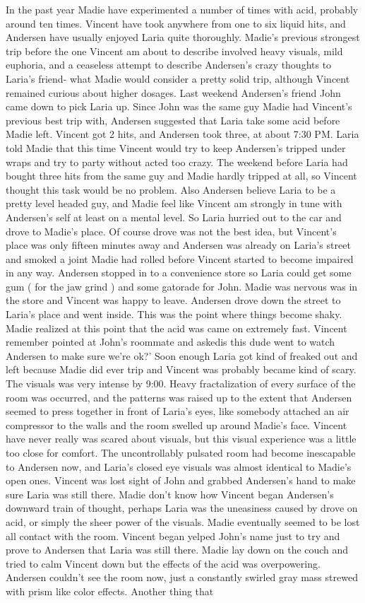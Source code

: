 \documentclass[12pt]{book}
\begin{document}
In the past year Madie have experimented a number of times with acid, probably around ten times. Vincent have took anywhere from one to six liquid hits, and Andersen have usually enjoyed Laria quite thoroughly. Madie's previous strongest trip before the one Vincent am about to describe involved heavy visuals, mild euphoria, and a ceaseless attempt to describe Andersen's crazy thoughts to Laria's friend- what Madie would consider a pretty solid trip, although Vincent remained curious about higher dosages. Last weekend Andersen's friend John came down to pick Laria up. Since John was the same guy Madie had Vincent's previous best trip with, Andersen suggested that Laria take some acid before Madie left. Vincent got 2 hits, and Andersen took three, at about 7:30 PM. Laria told Madie that this time Vincent would try to keep Andersen's tripped under wraps and try to party without acted too crazy. The weekend before Laria had bought three hits from the same guy and Madie hardly tripped at all, so Vincent thought this task would be no problem. Also Andersen believe Laria to be a pretty level headed guy, and Madie feel like Vincent am strongly in tune with Andersen's self at least on a mental level. So Laria hurried out to the car and drove to Madie's place. Of course drove was not the best idea, but Vincent's place was only fifteen minutes away and Andersen was already on Laria's street and smoked a joint Madie had rolled before Vincent started to become impaired in any way. Andersen stopped in to a convenience store so Laria could get some gum ( for the jaw grind ) and some gatorade for John. Madie was nervous was in the store and Vincent was happy to leave. Andersen drove down the street to Laria's place and went inside. This was the point where things become shaky. Madie realized at this point that the acid was came on extremely fast. Vincent remember pointed at John's roommate and askedis this dude went to watch Andersen to make sure we're ok?' Soon enough Laria got kind of freaked out and left because Madie did ever trip and Vincent was probably became kind of scary. The visuals was very intense by 9:00. Heavy fractalization of every surface of the room was occurred, and the patterns was raised up to the extent that Andersen seemed to press together in front of Laria's eyes, like somebody attached an air compressor to the walls and the room swelled up around Madie's face. Vincent have never really was scared about visuals, but this visual experience was a little too close for comfort. The uncontrollably pulsated room had become inescapable to Andersen now, and Laria's closed eye visuals was almost identical to Madie's open ones. Vincent was lost sight of John and grabbed Andersen's hand to make sure Laria was still there. Madie don't know how Vincent began Andersen's downward train of thought, perhaps Laria was the uneasiness caused by drove on acid, or simply the sheer power of the visuals. Madie eventually seemed to be lost all contact with the room. Vincent began yelped John's name just to try and prove to Andersen that Laria was still there. Madie lay down on the couch and tried to calm Vincent down but the effects of the acid was overpowering. Andersen couldn't see the room now, just a constantly swirled gray mass strewed with prism like color effects. Another thing that 
\end{document}
